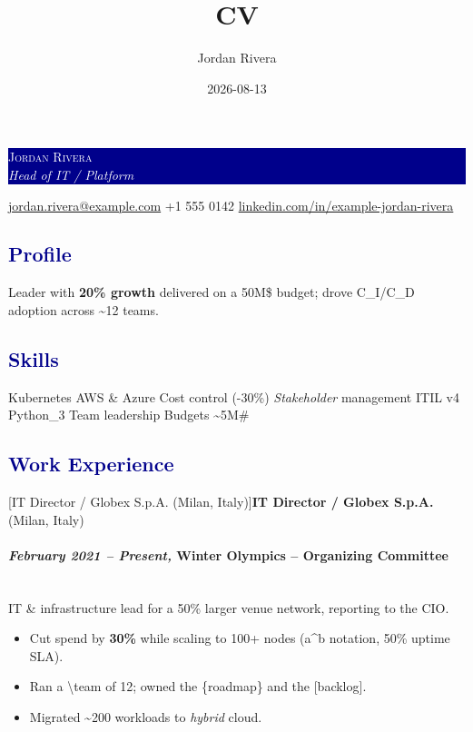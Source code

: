 \documentclass[a4paper]{article}
\title{CV}
\author{Jordan Rivera}
\date{2026-08-13}
\makeatletter
\newcommand\textstyleStrongEmphasis[1]{\textbf{#1}}
\newcommand\textstyleEmphasis[1]{\textit{#1}}
\renewcommand\subsubsection{\@startsection{subsubsection}{3}{\z@}{-3.25ex\@plus -1ex \@minus -.2ex}{0.3ex}{\normalfont\normalsize\bfseries}}
\newcommand\liststyleListi{%
\renewcommand\labelitemi{{\textbullet}}
\renewcommand\labelitemii{{\textbullet}}
\renewcommand\labelitemiii{{\textbullet}}
\renewcommand\labelitemiv{{\textbullet}}
}
\makeatother
\begin{document}
\noindent
\colorbox{darkblue}{\parbox{\dimexpr\linewidth-2\fboxsep}{%
  \textcolor{white}{\Large\scshape Jordan Rivera}\\[2pt]
  \textcolor{white}{\large\itshape Head of IT / Platform}}}



\begin{center}
  \textcolor{darkblue}{\faEnvelope}\hspace{0.35em}\href{mailto:jordan.rivera@example.com}{jordan.rivera@example.com}\quad
  \textcolor{darkblue}{\faPhone}\hspace{0.35em}+1 555 0142\quad
  \textcolor{darkblue}{\faLinkedin}\hspace{0.35em}\href{https://www.linkedin.com/in/example-jordan-rivera}{linkedin.com/in/example-jordan-rivera}
\end{center}
\textcolor{darkblue}{\subsection{Profile}}
{Leader with \textbf{20\% growth} delivered on a 50M\$ budget; drove C\_I/C\_D adoption across \textasciitilde{}12 teams.}

\textcolor{darkblue}{\subsection{Skills}}
\noindent
{Kubernetes {\textbullet} AWS \& Azure {\textbullet} Cost control (-30\%) {\textbullet} \textit{Stakeholder} management {\textbullet} ITIL v4 {\textbullet} Python\_3 {\textbullet} Team leadership {\textbullet} Budgets \textasciitilde{}5M\#}

\textcolor{darkblue}{\subsection{Work Experience}}
\subsubsection[IT Director / Globex S.p.A. (Milan, Italy)]{\textstyleStrongEmphasis{IT Director / Globex S.p.A.} \textmd{(Milan, Italy)}}
\paragraph[February 2021 {}-- Present, Winter Olympics {}-- Organizing Committee]{\textstyleEmphasis{February 2021 {}-- Present, }\textstyleStrongEmphasis{Winter Olympics {}-- Organizing Committee}}
\leavevmode\\[0.7ex]
IT \& infrastructure lead for a 50\% larger venue network, reporting to the CIO.
\liststyleListi
\begin{itemize}\setlength\itemsep{0pt}\setlength\parsep{3pt}
\item {Cut spend by \textbf{30\%} while scaling to 100+ nodes (a\textasciicircum{}b notation, 50\% uptime SLA).}
\item {Ran a \textbackslash{}team of 12; owned the \{roadmap\} and the {[}backlog{]}.}
\item {Migrated \textasciitilde{}200 workloads to \textit{hybrid} cloud.}
\end{itemize}
\end{document}
